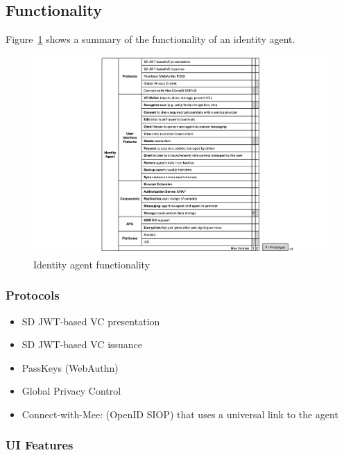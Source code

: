 \documentclass[11pt, oneside]{article}   	%
\begin{document}
\subsection{Functionality}

Figure~\ref{fig:functionality} shows a summary of the functionality of an identity agent.

\begin{figure}[htbp]
\includegraphics[width=\textwidth]{./images/agent-functionality.png}
\caption{Identity agent functionality}
\label{fig:functionality}
\end{figure}

\subsubsection{Protocols}

\begin{itemize}
\item SD JWT-based VC presentation
\item SD JWT-based VC issuance
\item PassKeys (WebAuthn)
\item Global Privacy Control
\item Connect-with-Mee: (OpenID SIOP) that uses a universal link to the agent
\end{itemize}

\subsubsection{UI Features}
\end{document}

